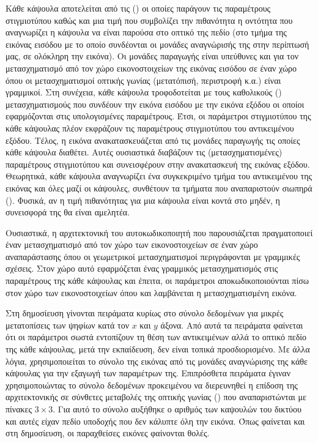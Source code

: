 Κάθε κάψουλα αποτελείται από τις  () οι οποίες παράγουν τις παραμέτρους στιγμιοτύπου καθώς και μια τιμή που συμβολίζει την πιθανότητα η οντότητα που αναγνωρίζει η κάψουλα να είναι παρούσα στο οπτικό της πεδίο (στο τμήμα της εικόνας εισόδου με το οποίο συνδέονται οι μονάδες αναγνώρισής της \textemdash στην περίπτωσή μας, σε ολόκληρη την εικόνα). Οι μονάδες παραγωγής είναι υπεύθυνες και για τον μετασχηματισμό από τον χώρο εικονοστοιχείων της εικόνας εισόδου σε έναν χώρο όπου οι μετασχηματισμοί οπτικής γωνίας (μετατόπισή, περιστροφή κ.α.) είναι γραμμικοί. Στη συνέχεια, κάθε κάψουλα τροφοδοτείται με τους καθολικούς () μετασχηματισμούς που συνδέουν την εικόνα εισόδου με την εικόνα εξόδου οι οποίοι εφαρμόζονται στις υπολογισμένες παραμέτρους. Έτσι, οι παράμετροι στιγμιοτύπου της κάθε κάψουλας πλέον εκφράζουν τις παραμέτρους στιγμιοτύπου του αντικειμένου εξόδου. Τέλος, η εικόνα ανακατασκευάζεται από τις μονάδες παραγωγής  τις οποίες κάθε κάψουλα διαθέτει. Αυτές ουσιαστικά διαβάζουν τις (μετασχηματισμένες) παραμέτρους στιγμιοτύπου και συνεισφέρουν στην ανακατασκευή της εικόνας εξόδου. Θεωρητικά, κάθε κάψουλα αναγνωρίζει ένα συγκεκριμένο τμήμα του αντικειμένου της εικόνας και όλες μαζί οι κάψουλες, συνθέτουν τα τμήματα που αναπαριστούν σιωπηρά (). Φυσικά, αν η τιμή πιθανότητας για μια κάψουλα είναι κοντά στο μηδέν, η συνεισφορά της θα είναι αμελητέα.\par

Ουσιαστικά, η αρχιτεκτονική του αυτο\textendash κωδικοποιητή που παρουσιάζεται πραγματοποιεί έναν μετασχηματισμό από τον χώρο των εικονοστοιχείων σε έναν χώρο αναπαράστασης όπου οι γεωμετρικοί μετασχηματισμοί περιγράφονται με γραμμικές σχέσεις. Στον χώρο αυτό εφαρμόζεται ένας γραμμικός μετασχηματισμός στις παραμέτρους της κάθε κάψουλας και έπειτα, οι παράμετροι αποκωδικοποιούνται πίσω στον χώρο των εικονοστοιχείων όπου και λαμβάνεται η μετασχηματισμένη εικόνα.\par

Στη δημοσίευση γίνονται πειράματα κυρίως στο σύνολο δεδομένων \cite{lecun1998gradientMNIST} για μικρές μετατοπίσεις των ψηφίων κατά τον $x$ και $y$ άξονα. Από αυτά τα πειράματα φαίνεται ότι οι παράμετροι σωστά εντοπίζουν τη θέση των αντικειμένων αλλά το οπτικό πεδίο της κάθε κάψουλας, μετά την εκπαίδευση, δεν είναι τοπικά προσδιορισμένο. Με άλλα λόγια, χρησιμοποιείται το σύνολο της εικόνας από τις μονάδες αναγνώρισης της κάθε κάψουλας για την εξαγωγή των παραμέτρων της. Επιπρόσθετα πειράματα έγιναν χρησιμοποιώντας το σύνολο δεδομένων \cite{lecun2004learning} προκειμένου να διερευνηθεί η επίδοση της αρχιτεκτονικής σε σύνθετες μεταβολές της οπτικής γωνίας () που αναπαριστώνται με πίνακες $3\times3$. Για αυτό το σύνολο αυξήθηκε ο αριθμός των καψουλών του δικτύου και αυτές είχαν πεδίο υποδοχής που δεν κάλυπτε όλη την εικόνα. Όπως φαίνεται και στη δημοσίευση\cite{hinton2011transforming}, οι παραχθείσες εικόνες φαίνονται θολές.\par

